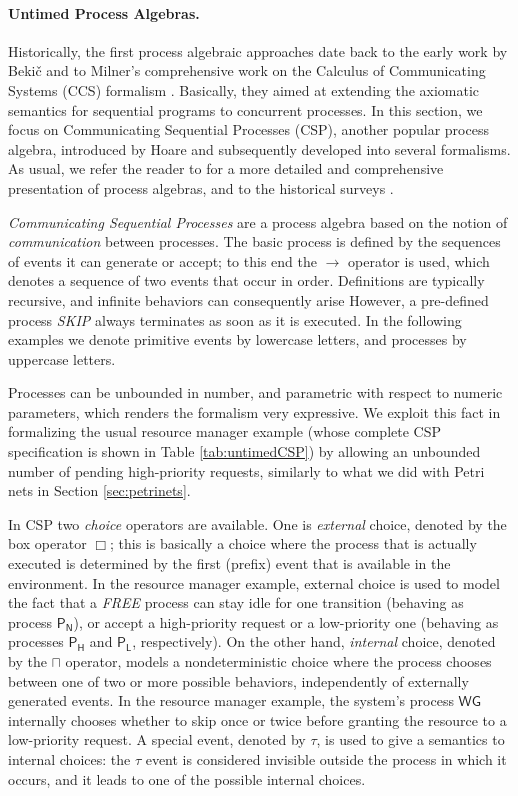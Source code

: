 \paragraph{Untimed Process Algebras.}
Historically, the first process algebraic approaches date back 
to the early work by Beki{\v c} \cite{Bek71} and to Milner's comprehensive 
work on the Calculus of Communicating Systems (CCS) formalism \cite{Mil80,Mil89}.
Basically, they aimed at extending the axiomatic 
semantics for sequential programs to concurrent processes. In 
this section, we focus on Communicating Sequential Processes 
(CSP), another popular process algebra, introduced by Hoare \cite{Hoa78,Hoa85} 
and subsequently developed into several formalisms. As usual, 
we refer the reader to \cite{BPS01} for a more detailed and comprehensive 
presentation of process algebras, and to the historical surveys \cite{Bae04,Bae03}.

\emph{Communicating Sequential Processes} are a process algebra 
based on the notion of \emph{communication} between processes. The 
basic process is defined by the sequences of events it can generate 
or accept; to this end the $\rightarrow$ operator is used, which denotes a 
sequence of two events that occur in order. Definitions are typically 
recursive, and infinite behaviors can consequently arise
However, a pre-defined process \textsl{SKIP} always terminates as soon as it
is executed. In the following examples we denote primitive events 
by lowercase letters, and processes by uppercase letters.

Processes can be unbounded in number, and parametric with respect 
to numeric parameters, which renders the formalism very expressive. 
We exploit this fact in formalizing the usual resource manager 
example (whose complete CSP specification is shown in Table \ref{tab:untimedCSP}) 
by allowing an unbounded number of pending high-priority requests, 
similarly to what we did with Petri nets in Section \ref{sec:petrinets}.

In CSP two \emph{choice} operators are available. One is \emph{external} 
choice, denoted by the box operator $\Box$; this is basically a 
choice where the process that is actually executed is determined 
by the first (prefix) event that is available in the environment. 
In the resource manager example, external choice is used to model 
the fact that a \textsl{FREE} process can stay idle for one transition 
(behaving as process $\mathsf{P_N}$), or accept a high-priority request or 
a low-priority one (behaving as processes $\mathsf{P_H}$ and $\mathsf{P_L}$, respectively). 
On the other hand, \emph{internal} choice, denoted by the $\sqcap$ operator, 
models a nondeterministic choice where the process chooses between 
one of two or more possible behaviors, independently of externally 
generated events. In the resource manager example, the system's 
process $\mathsf{WG}$ internally chooses whether to skip once or twice 
before granting the resource to a low-priority request. A special 
event, denoted by $\tau$, is used to give a semantics to internal 
choices: the $\tau$ event is considered invisible outside 
the process in which it occurs, and it leads to one of the possible 
internal choices.

